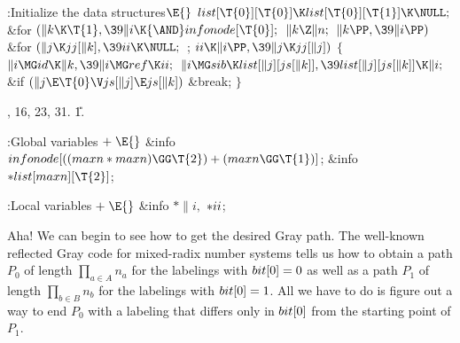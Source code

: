 \B{}:Initialize the data structures\X${}\E{}$\6
$\\{list}[\T{0}][\T{0}]\K\\{list}[\T{0}][\T{1}]\K\NULL;{}$\6
\&{for} ${}(\|k\K\T{1},\39\|i\K{\AND}\\{infonode}[\T{0}];{}$ ${}\|k\Z\|n;{}$
${}\|k\PP,\39\|i\PP){}$\1\6
\&{for} ${}(\|j\K\\{jj}[\|k],\39\\{ii}\K\NULL;{}$  ; ${}\\{ii}\K\|i\PP,\39\|j\K%
\\{jj}[\|j]){}$\5
${}\{{}$\1\6
${}\|i\MG\\{id}\K\|k,\39\|i\MG\\{ref}\K\\{ii};{}$\6
${}\|i\MG\\{sib}\K\\{list}[\|j][\\{js}[\|k]],\39\\{list}[\|j][\\{js}[\|k]]\K%
\|i;{}$\6
\&{if} ${}(\|j\E\T{0}\V\\{js}[\|j]\E\\{js}[\|k]){}$\1\5
\&{break};\2\6
\4${}\}{}$\2\2\par
{}, 16, 23, 31.
\U1.\fi

\B{}:Global variables\X${}\mathrel+\E{}$\6
\&{info} ${}\\{infonode}[((\\{maxn}*\\{maxn})\GG\T{2})+(\\{maxn}\GG\T{1})]{}$;%
\6
\&{info} ${}{*}\\{list}[\\{maxn}][\T{2}]{}$;\par
\fi

\B{}:Local variables\X${}\mathrel+\E{}$\6
\&{info} ${}{*}\|i,{}$ ${}{*}\\{ii}{}$;\par
\fi

Aha! We can begin to see how to get the desired Gray
path. The well-known
reflected Gray code for mixed-radix number systems tells us how to obtain a
path $P_0$ of length $\prod_{a\in A}n_a$ for the labelings with $\\{bit}[0]=0$ as
well as a path $P_1$ of length $\prod_{b\in B}n_b$ for the labelings with
$\\{bit}[0]=1$. All we have to do is figure out a way to end $P_0$ with
a labeling that differs only in $\\{bit}[0]$ from the starting point of $P_1$.

